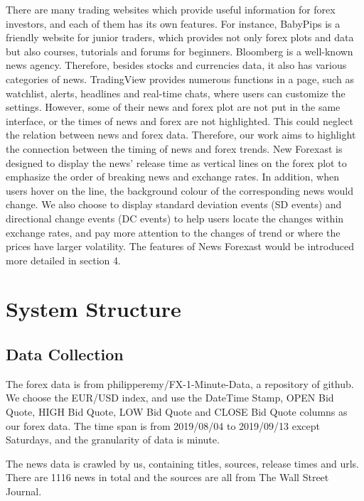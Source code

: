 \documentclass[sigconf]{acmart}
\begin{document}
There are many trading websites which provide useful information for forex investors, and each of them has its own features\cite{ForexWebsites}. For instance, BabyPips\cite{BabyPips} is a friendly website for junior traders, which provides not only forex plots and data but also courses, tutorials and forums for beginners. Bloomberg\cite{Bloomberg} is a well-known news agency. Therefore, besides stocks and currencies data, it also has various categories of news. TradingView\cite{TradingView} provides numerous functions in a page, such as watchlist, alerts, headlines and real-time chats, where users can customize the settings. However, some of their news and forex plot are not put in the same interface, or the times of news and forex are not highlighted. This could neglect the relation between news and forex data. Therefore, our work aims to highlight the connection between the timing of news and forex trends. New Forexast is designed to display the news’ release time as vertical lines on the forex plot to emphasize the order of breaking news and exchange rates. In addition, when users hover on the line, the background colour of the corresponding news would change. 
We also choose to display standard deviation events (SD events) and directional change events (DC events)\cite{7850020} to help users locate the changes within exchange rates, and pay more attention to the changes of trend or where the prices have larger volatility. The features of News Forexast would be introduced more detailed in section 4.




\section{System Structure}

\subsection{Data Collection}
The forex data is from philipperemy/FX-1-Minute-Data\cite{FX-1-Minute-Data}, a repository of github. We choose the EUR/USD index, and use the DateTime Stamp, OPEN Bid Quote, HIGH Bid Quote, LOW Bid Quote and CLOSE Bid Quote columns as our forex data. The time span is from 2019/08/04 to 2019/09/13 except Saturdays, and the granularity of data is minute. 

The news data is crawled by us, containing titles, sources, release times and urls. There are 1116 news in total and the sources are all from The Wall Street Journal\cite{WSJ}.
\end{document}
